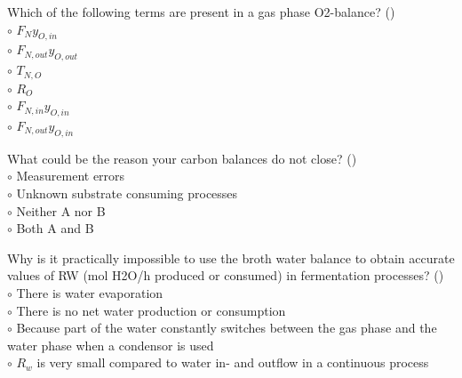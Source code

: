 \documentclass[]{beamer}
\begin{document}
\begin{frame}[shrink] {}
\addtocounter{questions}{1}
\color{blue}
Which of the following terms are present in a gas phase O2-balance?  ()\\
\color{black}
\setlength{\parindent}{-0.4cm}
{\color{red}$\circ$}   $F_{N}y_{O,in}$\\   
{\color{red}$\circ$}   $F_{N,out}y_{O,out}$\\   
{\color{red}$\circ$} $T_{N,O}$\\
{\color{red}$\circ$} $R_O$\\
{\color{red}$\circ$}   $F_{N,in}y_{O,in}$  \\ 
{\color{red}$\circ$}   $F_{N,out}y_{O,in}$   
\end{frame}

\begin{frame}[shrink] {}
\addtocounter{questions}{1}
\color{blue}
What could be the reason your carbon balances do not close?  ()\\
\color{black}
\setlength{\parindent}{-0.4cm}
{\color{red}$\circ$}    Measurement errors\\
{\color{red}$\circ$} Unknown substrate consuming processes\\
{\color{red}$\circ$} Neither A nor B \\
{\color{red}$\circ$} Both A and B   \\
\end{frame}

\begin{frame}[shrink] {}
\addtocounter{questions}{1}
\color{blue}
Why is it practically impossible to use the broth water balance to obtain accurate values of RW (mol H2O/h produced or consumed) in fermentation processes?  ()\\
\color{black}
\setlength{\parindent}{-0.4cm}
{\color{red}$\circ$}    There is water evaporation\\
{\color{red}$\circ$} There is no net water production or consumption  \\
{\color{red}$\circ$} Because part of the water constantly switches between the gas phase and the water phase when a condensor is used \\
{\color{red}$\circ$} $R_w$ is very small compared to water in- and outflow in a continuous process   
\end{frame}
\end{document}
